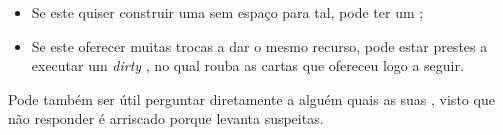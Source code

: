 \documentclass[12pt]{article}
\begin{document}
\begin{itemize}
\begin{itemize}[noitemsep]
        \item Se este quiser construir uma  sem espaço para tal, pode ter um ;
        \item Se este oferecer muitas trocas a dar o mesmo recurso, pode estar prestes a executar um \textit{dirty} , no qual rouba as cartas que ofereceu logo a seguir.
    \end{itemize}
    \vspace{-0.3cm}
    Pode também ser útil perguntar diretamente a alguém quais as suas , visto que não responder é arriscado porque levanta suspeitas.
\end{itemize}
\end{document}
